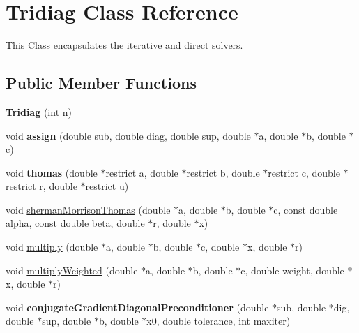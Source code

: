 \hypertarget{classTridiag}{}\section{Tridiag Class Reference}
\label{classTridiag}


This Class encapsulates the iterative and direct solvers.  


\subsection*{Public Member Functions}
\begin{DoxyCompactItemize}
\item 
\mbox{\label{classTridiag_af717eb715c5709d6d0f13f312145602d}} 
{\bfseries Tridiag} (int n)
\item 
\mbox{\label{classTridiag_af784b571a896a2d17255aca88f66b989}} 
void {\bfseries assign} (double sub, double diag, double sup, double $\ast$a, double $\ast$b, double $\ast$c)
\item 
\mbox{\label{classTridiag_aa51271a841e5ea33dd22920e24b3cfc6}} 
void {\bfseries thomas} (double $\ast$restrict a, double $\ast$restrict b, double $\ast$restrict c, double $\ast$restrict r, double $\ast$restrict u)
\item 
void \mbox{\hyperlink{classTridiag_a9297b674ba991225e47ac01ceac59e0a}{sherman\+Morrison\+Thomas}} (double $\ast$a, double $\ast$b, double $\ast$c, const double alpha, const double beta, double $\ast$r, double $\ast$x)
\item 
void \mbox{\hyperlink{classTridiag_a2c9bbd9354b0df81416b5505d8dc3aca}{multiply}} (double $\ast$a, double $\ast$b, double $\ast$c, double $\ast$x, double $\ast$r)
\item 
void \mbox{\hyperlink{classTridiag_ae409dd806d1ad813cf57efb2ac5b7f9f}{multiply\+Weighted}} (double $\ast$a, double $\ast$b, double $\ast$c, double weight, double $\ast$x, double $\ast$r)
\item 
\mbox{\label{classTridiag_afca499f27e2157aad00dd9495735dc26}} 
void {\bfseries conjugate\+Gradient\+Diagonal\+Preconditioner} (double $\ast$sub, double $\ast$dig, double $\ast$sup, double $\ast$b, double $\ast$x0, double tolerance, int maxiter)
\item 
\mbox{\label{classTridiag_a592021304483572067a2ba090dbf65d5}} 

\end{DoxyCompactItemize}
